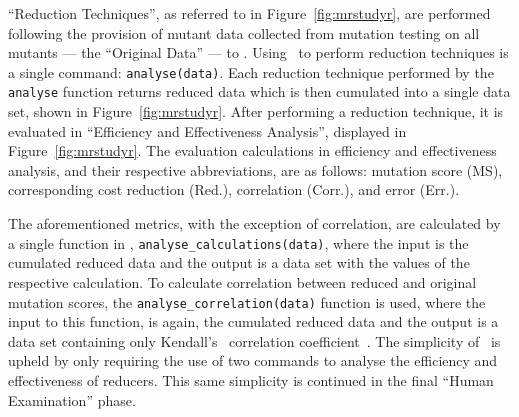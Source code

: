 ``Reduction Techniques'', as referred to in Figure~\ref{fig:mrstudyr}, are performed following the provision
of mutant data collected from mutation testing on all mutants --- the ``Original Data'' --- to \mr. Using
\mr~to perform reduction techniques is a single command: \texttt{analyse(data)}. Each reduction technique performed by
the \texttt{analyse} function returns reduced data which is then cumulated into a single data set, shown in
Figure~\ref{fig:mrstudyr}. After performing a reduction technique, it is evaluated in ``Efficiency and Effectiveness
Analysis'', displayed in Figure~\ref{fig:mrstudyr}.
The evaluation calculations in efficiency and effectiveness analysis, and their respective abbreviations, are as
follows: mutation score
(MS), corresponding cost reduction (Red.), correlation (Corr.), and error (Err.).


The aforementioned metrics, with the exception of correlation, are calculated by a single function in \mr,
\texttt{analyse\_calculations(data)}, where the input is the cumulated reduced data and the output is a data set with
the values of the respective calculation. To calculate correlation between reduced and original mutation scores, the
\texttt{analyse\_correlation(data)} function is used, where the input to this function, is again, the cumulated reduced
data and the output is a data set containing only Kendall's \taub~correlation coefficient~\cite{mcminn2016virtual}. The
simplicity of \mr~is upheld by only requiring the use of two commands to analyse the efficiency and effectiveness of
reducers. This same simplicity is continued in the final ``Human Examination'' phase.


